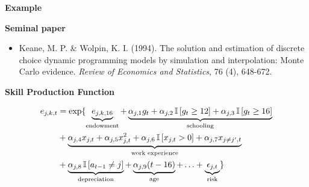 \begin{frame}\begin{center}
\LARGE\textbf{Example}
\end{center}\end{frame}
\begin{frame}\textbf{Seminal paper}\vspace{0.3cm}

\begin{itemize}\setlength\itemsep{1em}
\item Keane, M. P. \& Wolpin, K. I. (1994). The solution and estimation of discrete choice dynamic programming models by simulation and interpolation: Monte Carlo evidence. \textit{Review of Economics and Statistics},  76 (4), 648-672.
\end{itemize}
\end{frame}
\begin{frame}\textbf{Skill Production Function}\vspace{0.3cm}

\begin{align*}
e_{j,k,t} & =  \exp\{ \underbrace{e_{j,k,16}}_{\text{endowment}}+ \underbrace{\alpha_{j,1} g_t + \alpha_{j,2} \,\mathbb{I}\,[g_t \geq 12] + \alpha_{j,3} \,\mathbb{I}\,[g_t \geq 16]}_{\text{schooling}}\\
                & + \underbrace{\alpha_{j,4} x_{j,t} + \alpha_{j,5} x^2_{j, t} + \alpha_{j,6} \,\mathbb{I}\,[x_{j, t} > 0] + \alpha_{j,7} x_{j\neq j^\prime, t}}_{\text{work experience}}  \\
                & + \underbrace{\alpha_{j,8}\,\mathbb{I}\,[a_{t - 1} \neq j] }_{\text{depreciation}} + \underbrace{\alpha_{j,9} (t - 16)}_{\text{age}} + \hdots + \underbrace{\epsilon_{j, t}}_{\text{risk}}\}
\end{align*}

\end{frame}
